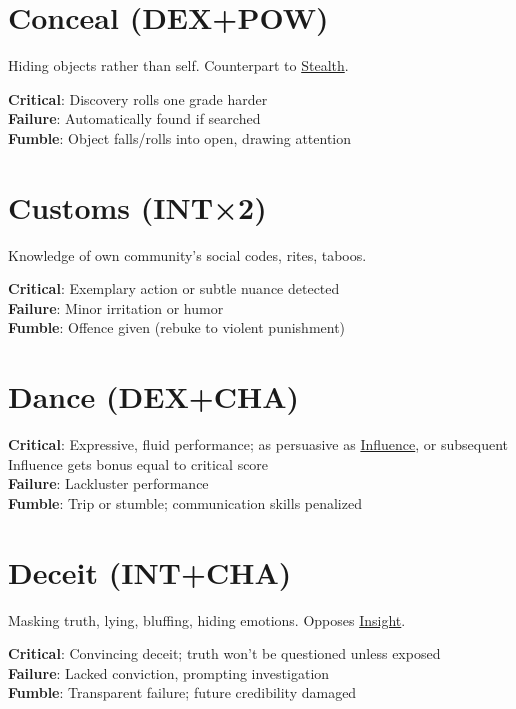 \documentclass[10pt]{article}
\begin{document}
\section{Conceal (DEX+POW)}
\label{skill:conceal}

Hiding objects rather than self. Counterpart to \hyperref[skill:stealth]{Stealth}.

\textbf{Critical}: Discovery rolls one grade harder\\
\textbf{Failure}: Automatically found if searched\\
\textbf{Fumble}: Object falls/rolls into open, drawing attention

\section{Customs (INT×2)}
\label{skill:customs}

Knowledge of own community's social codes, rites, taboos.

\textbf{Critical}: Exemplary action or subtle nuance detected\\
\textbf{Failure}: Minor irritation or humor\\
\textbf{Fumble}: Offence given (rebuke to violent punishment)

\section{Dance (DEX+CHA)}
\label{skill:dance}

\textbf{Critical}: Expressive, fluid performance; as persuasive as \hyperref[skill:influence]{Influence}, or subsequent Influence gets bonus equal to critical score\\
\textbf{Failure}: Lackluster performance\\
\textbf{Fumble}: Trip or stumble; communication skills penalized

\section{Deceit (INT+CHA)}
\label{skill:deceit}

Masking truth, lying, bluffing, hiding emotions. Opposes \hyperref[skill:insight]{Insight}.

\textbf{Critical}: Convincing deceit; truth won't be questioned unless exposed\\
\textbf{Failure}: Lacked conviction, prompting investigation\\
\textbf{Fumble}: Transparent failure; future credibility damaged
\end{document}
